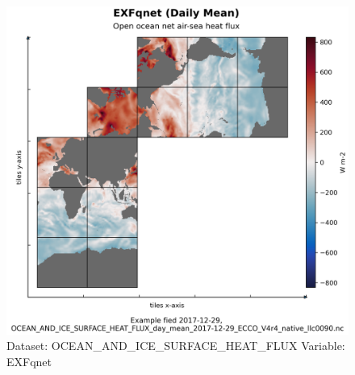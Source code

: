 \begin{figure}[H]
\centering
\includegraphics[scale=0.55]{../images/plots/native_plots/Ocean_and_Sea-Ice_Surface_Heat_Fluxes/EXFqnet.png}
\caption{Dataset: OCEAN\_AND\_ICE\_SURFACE\_HEAT\_FLUX Variable: EXFqnet}
\label{tab:table-OCEAN_AND_ICE_SURFACE_HEAT_FLUX_EXFqnet-Plot}
\end{figure}
\pagebreak
